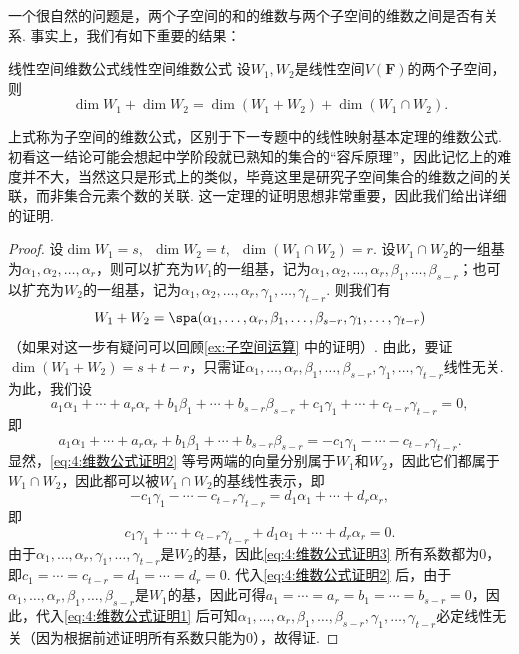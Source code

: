 一个很自然的问题是，两个子空间的和的维数与两个子空间的维数之间是否有关系. 事实上，我们有如下重要的结果：

\begin{theorem}{线性空间维数公式}{线性空间维数公式}
    设$W_1,W_2$是线性空间$V(\mathbf{F})$的两个子空间，则
    \[\dim W_1+\dim W_2=\dim(W_1+W_2)+\dim(W_1\cap W_2).\]
\end{theorem}
上式称为子空间的维数公式，区别于下一专题中的线性映射基本定理的维数公式. 初看这一结论可能会想起中学阶段就已熟知的集合的``容斥原理''，因此记忆上的难度并不大，当然这只是形式上的类似，毕竟这里是研究子空间集合的维数之间的关联，而非集合元素个数的关联. 这一定理的证明思想非常重要，因此我们给出详细的证明.

\begin{proof}
    设$\dim W_1=s,\enspace \dim W_2=t,\enspace \dim(W_1\cap W_2)=r$. 设$W_1\cap W_2$的一组基为$\alpha_1,\alpha_2,\ldots,\alpha_r$，则可以扩充为$W_1$的一组基，记为$\alpha_1,\alpha_2,\ldots,\alpha_r,\beta_1,\ldots,\beta_{s-r}$；也可以扩充为$W_2$的一组基，记为$\alpha_1,\alpha_2,\ldots,\alpha_r,\gamma_1,\ldots,\gamma_{t-r}$. 则我们有
    \[W_1+W_2=\spa(\alpha_1,\ldots,\alpha_r,\beta_1,\ldots,\beta_{s-r},\gamma_1,\ldots,\gamma_{t-r})\]
    （如果对这一步有疑问可以回顾\autoref{ex:子空间运算} 中的证明）. 由此，要证$\dim (W_1+W_2)=s+t-r$，只需证$\alpha_1,\ldots,\alpha_r,\beta_1,\ldots,\beta_{s-r},\gamma_1,\ldots,\gamma_{t-r}$线性无关. 为此，我们设
    \begin{equation}\label{eq:4:维数公式证明1}
        a_1\alpha_1+\cdots+a_r\alpha_r+b_1\beta_1+\cdots+b_{s-r}\beta_{s-r}+c_1\gamma_1+\cdots+c_{t-r}\gamma_{t-r}=0,
    \end{equation}
    即
    \begin{equation}\label{eq:4:维数公式证明2}
        a_1\alpha_1+\cdots+a_r\alpha_r+b_1\beta_1+\cdots+b_{s-r}\beta_{s-r}=-c_1\gamma_1-\cdots-c_{t-r}\gamma_{t-r}.
    \end{equation}
    显然，\autoref{eq:4:维数公式证明2} 等号两端的向量分别属于$W_1$和$W_2$，因此它们都属于$W_1\cap W_2$，因此都可以被$W_1\cap W_2$的基线性表示，即
    \[-c_1\gamma_1-\cdots-c_{t-r}\gamma_{t-r}=d_1\alpha_1+\cdots+d_r\alpha_r,\]
    即
    \begin{equation}\label{eq:4:维数公式证明3}
        c_1\gamma_1+\cdots+c_{t-r}\gamma_{t-r}+d_1\alpha_1+\cdots+d_r\alpha_r=0.
    \end{equation}
    由于$\alpha_1,\ldots,\alpha_r,\gamma_1,\ldots,\gamma_{t-r}$是$W_2$的基，因此\autoref{eq:4:维数公式证明3} 所有系数都为0，即$c_1=\cdots=c_{t-r}=d_1=\cdots=d_r=0$. 代入\autoref{eq:4:维数公式证明2} 后，由于$\alpha_1,\ldots,\alpha_r,\beta_1,\ldots,\beta_{s-r}$是$W_1$的基，因此可得$a_1=\cdots=a_r=b_1=\cdots=b_{s-r}=0$，因此，代入\autoref{eq:4:维数公式证明1} 后可知$\alpha_1,\ldots,\alpha_r,\beta_1,\ldots,\beta_{s-r},\gamma_1,\ldots,\gamma_{t-r}$必定线性无关（因为根据前述证明所有系数只能为0），故得证.
\end{proof}

